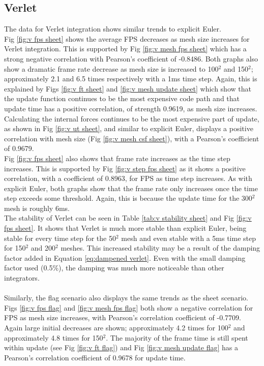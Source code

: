 \subsection{Verlet}
The data for Verlet integration shows similar trends to explicit Euler.
\\Fig \ref{fig:v fps sheet} shows the average FPS decreases as mesh size increases for Verlet integration. This is supported by Fig \ref{fig:v mesh fps sheet} which has a strong negative correlation with Pearson's coefficient of -0.8486. Both graphs also show a dramatic frame rate decrease as mesh size is increased to 100$^{2}$ and 150$^{2}$; approximately 2.1 and 6.5 times respectively with a 1ms time step. Again, this is explained by Figs \ref{fig:v ft sheet} and \ref{fig:v mesh update sheet} which show that the update function continues to be the most expensive code path and that update time has a positive correlation, of strength 0.9619, as mesh size increases. Calculating the internal forces continues to be the most expensive part of update, as shown in Fig \ref{fig:v ut sheet}, and similar to explicit Euler, displays a positive correlation with mesh size (Fig \ref{fig:v mesh csf sheet}), with a Pearson's coefficient of 0.9679.
\\Fig \ref{fig:v fps sheet} also shows that frame rate increases as the time step increases. This is supported by Fig \ref{fig:v step fps sheet} as it shows a positive correlation, with a coefficient of 0.8963, for FPS as time step increases. As with explicit Euler, both graphs show that the frame rate only increases once the time step exceeds some threshold. Again, this is because the update time for the 300$^{2}$ mesh is roughly 6ms.
\\The stability of Verlet can be seen in Table \ref{tab:v stability sheet} and Fig \ref{fig:v fps sheet}. It shows that Verlet is much more stable than explicit Euler, being stable for every time step for the 50$^{2}$ mesh and even stable with a 5ms time step for 150$^{2}$ and 200$^{2}$ meshes. This increased stability may be a result of the damping factor added in Equation \ref{eq:dampened verlet}. Even with the small damping factor used (0.5\%), the damping was much more noticeable than other integrators.
\\\\Similarly, the flag scenario also displays the same trends as the sheet scenario. Figs \ref{fig:v fps flag} and \ref{fig:v mesh fps flag} both show a negative correlation for FPS as mesh size increases, with Pearson's correlation coefficient of -0.7709. Again large initial decreases are shown; approximately 4.2 times for 100$^{2}$ and approximately 4.8 times for 150$^{2}$. The majority of the frame time is still spent within update (see Fig \ref{fig:v ft flag}) and Fig \ref{fig:v mesh update flag} has a Pearson's correlation coefficient of 0.9678 for update time.
